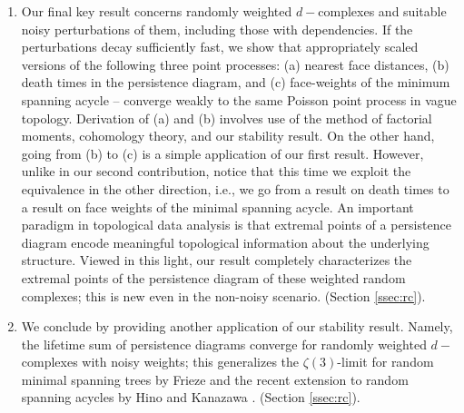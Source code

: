 \documentclass[12pt]{amsart}
\newcommand{\gt}[1]{\textcolor{blue}{#1}}
\renewcommand{\gt}[1]{#1}
\numberwithin{equation}{section}
\numberwithin{theorem}{section}
\newcommand{\1}{\mathbf{1}}
\begin{document}
\begin{enumerate}
\item \gt{Our final key result concerns randomly weighted $d-$complexes and suitable noisy perturbations of them, including those with dependencies. If the perturbations decay sufficiently fast, we show that appropriately} scaled versions of the following three point processes: (a) nearest face distances, (b) death times in the persistence diagram, and (c) face-weights of the minimum spanning acycle -- converge weakly to the same Poisson point process in vague topology. \gt{Derivation of (a) and (b) involves use of the method of factorial moments, cohomology theory, and our stability result. On the other hand, going from (b) to (c) is a simple application of our first result. However, unlike in our second contribution, notice that this time we exploit the equivalence in the other direction, i.e., we go from a result on death times to a result on face weights of the minimal spanning acycle.} An important paradigm in topological data analysis is that extremal points of a persistence diagram encode meaningful topological information about the underlying structure. Viewed in this light, our result completely characterizes the extremal points of the persistence diagram of these weighted random complexes; this is new even in the non-noisy scenario. (Section \ref{ssec:rc}).

\item We conclude by providing another application of our stability result. Namely, the lifetime sum of persistence diagrams converge for randomly weighted $d-$complexes with noisy weights; this generalizes the $\zeta(3)$-limit for random minimal spanning trees by Frieze \cite{Frieze85} and the recent extension to random spanning acycles by Hino and Kanazawa \cite{Hino2018}. (Section \ref{ssec:rc}).

\end{enumerate}
%
\end{document}
